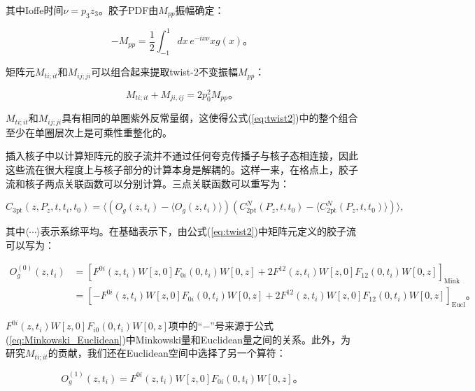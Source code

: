 \documentclass[12pt,a4paper]{ctexart}
\theoremstyle{definition}
\begin{document}
其中Ioffe时间$\nu = p_3 z_3$。胶子PDF由$M_{pp}$振幅确定：

\begin{equation}
-M_{pp} = \frac{1}{2} \int_{-1}^{1} dx\, e^{-ix\nu} x g(x)。
\label{eq:Mpp_to_pdf}
\end{equation}

矩阵元$M_{ti;it}$和$M_{ij;ji}$可以组合起来提取twist-2不变振幅$M_{pp}$：

\begin{equation}
M_{ti;it} + M_{ji,ij} = 2p^2_0 M_{pp}。
\label{eq:twist2}
\end{equation}

$M_{ti;it}$和$M_{ij;ji}$具有相同的单圈紫外反常量纲，这使得公式(\ref{eq:twist2})中的整个组合至少在单圈层次上是可乘性重整化的\cite{Balitsky2020}。

插入核子中以计算矩阵元的胶子流并不通过任何夸克传播子与核子态相连接，因此这些流在很大程度上与核子部分的计算本身是解耦的。这样一来，在格点上，胶子流和核子两点关联函数可以分别计算。三点关联函数可以重写为：

\begin{equation}
C_{\text{3pt}}(z, P_z, t, t_i, t_0) = \langle (O_g(z, t_i) - \langle O_g(z, t_i) \rangle)(C^N_{\text{2pt}}(P_z, t, t_0) - \langle C^N_{\text{2pt}}(P_z, t, t_0) \rangle) \rangle,
\label{eq:3pt_disconnected}
\end{equation}

其中$\langle\cdots\rangle$表示系综平均。在基础表示下，由公式(\ref{eq:twist2})中矩阵元定义的胶子流可以写为：

\begin{equation}
\begin{aligned}
O^{(0)}_g(z, t_i) &= \left[ F^{0i}(z, t_i) W[z,0] F_{0i}(0, t_i) W[0,z] + 2F^{12}(z, t_i) W[z,0] F_{12}(0, t_i) W[0,z] \right]_{\text{Mink}} \\
&= \left[ -F^{0i}(z, t_i) W[z,0] F_{0i}(0, t_i) W[0,z] + 2F^{12}(z, t_i) W[z,0] F_{12}(0, t_i) W[0,z] \right]_{\text{Eucl}}。
\end{aligned}
\label{eq:Og0}
\end{equation}

$F^{0i}(z, t_i) W[z,0] F_{i0}(0, t_i) W[0,z]$项中的``$-$''号来源于公式(\ref{eq:Minkowski_Euclidean})中Minkowski量和Euclidean量之间的关系。此外，为研究$M_{ti;it}$的贡献，我们还在Euclidean空间中选择了另一个算符：

\begin{equation}
O^{(1)}_g(z, t_i) = F^{0i}(z, t_i) W[z,0] F_{0i}(0, t_i) W[0,z]。
\label{eq:Og1}
\end{equation}
\end{document}
